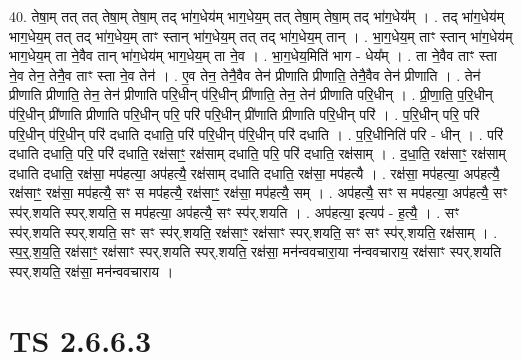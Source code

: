 \documentclass[17pt]{extarticle}
\begin{document}
40. तेषा॒म् तत् तत् तेषा॒म् तेषा॒म् तद् भा॑ग॒धेय॑म् भाग॒धेय॒म् तत् तेषा॒म् तेषा॒म् तद् भा॑ग॒धेय᳚म् । . तद् भा॑ग॒धेय॑म् भाग॒धेय॒म् तत् तद् भा॑ग॒धेय॒म् ताꣳ स्तान् भा॑ग॒धेय॒म् तत् तद् भा॑ग॒धेय॒म् तान् । . भा॒ग॒धेय॒म् ताꣳ स्तान् भा॑ग॒धेय॑म् भाग॒धेय॒म् ता ने॒वैव तान् भा॑ग॒धेय॑म् भाग॒धेय॒म् ता ने॒व । . भा॒ग॒धेय॒मिति॑ भाग - धेय᳚म् । . ता ने॒वैव ताꣳ स्ता ने॒व तेन॒ तेनै॒व ताꣳ स्ता ने॒व तेन॑ । . ए॒व तेन॒ तेनै॒वैव तेन॑ प्रीणाति प्रीणाति॒ तेनै॒वैव तेन॑ प्रीणाति । . तेन॑ प्रीणाति प्रीणाति॒ तेन॒ तेन॑ प्रीणाति परि॒धीन् प॑रि॒धीन् प्री॑णाति॒ तेन॒ तेन॑ प्रीणाति परि॒धीन् । . प्री॒णा॒ति॒ प॒रि॒धीन् प॑रि॒धीन् प्री॑णाति प्रीणाति परि॒धीन् परि॒ परि॑ परि॒धीन् प्री॑णाति प्रीणाति परि॒धीन् परि॑ । . प॒रि॒धीन् परि॒ परि॑ परि॒धीन् प॑रि॒धीन् परि॑ दधाति दधाति॒ परि॑ परि॒धीन् प॑रि॒धीन् परि॑ दधाति । . प॒रि॒धीनिति॑ परि - धीन् । . परि॑ दधाति दधाति॒ परि॒ परि॑ दधाति॒ रक्ष॑साꣳ॒॒ रक्ष॑साम् दधाति॒ परि॒ परि॑ दधाति॒ रक्ष॑साम् । . द॒धा॒ति॒ रक्ष॑साꣳ॒॒ रक्ष॑साम् दधाति दधाति॒ रक्ष॑सा॒ मप॑हत्या॒ अप॑हत्यै॒ रक्ष॑साम् दधाति दधाति॒ रक्ष॑सा॒ मप॑हत्यै । . रक्ष॑सा॒ मप॑हत्या॒ अप॑हत्यै॒ रक्ष॑साꣳ॒॒ रक्ष॑सा॒ मप॑हत्यै॒ सꣳ स मप॑हत्यै॒ रक्ष॑साꣳ॒॒ रक्ष॑सा॒ मप॑हत्यै॒ सम् । . अप॑हत्यै॒ सꣳ स मप॑हत्या॒ अप॑हत्यै॒ सꣳ स्प॑र्.शयति स्पर्.शयति॒ स मप॑हत्या॒ अप॑हत्यै॒ सꣳ स्प॑र्.शयति । . अप॑हत्या॒ इत्यप॑ - ह॒त्यै॒ । . सꣳ स्प॑र्.शयति स्पर्.शयति॒ सꣳ सꣳ स्प॑र्.शयति॒ रक्ष॑साꣳ॒॒ रक्ष॑साꣳ स्पर्.शयति॒ सꣳ सꣳ स्प॑र्.शयति॒ रक्ष॑साम् । . स्प॒र्॒.श॒य॒ति॒ रक्ष॑साꣳ॒॒ रक्ष॑साꣳ स्पर्.शयति स्पर्.शयति॒ रक्ष॑सा॒ मन॑न्ववचारा॒या न॑न्ववचाराय॒ रक्ष॑साꣳ स्पर्.शयति स्पर्.शयति॒ रक्ष॑सा॒ मन॑न्ववचाराय । \newline
\pagebreak
{}
\section*{ TS 2.6.6.3 }
\end{document}
